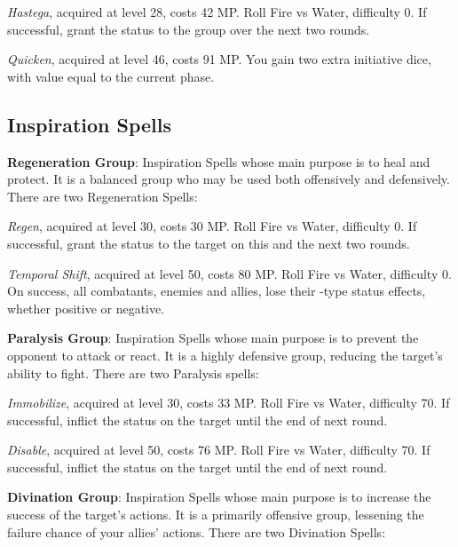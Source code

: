 \begin{multicols}{2}
    \textit{Hastega}, acquired at level 28, costs 42 MP\@. Roll Fire vs Water, difficulty 0. If successful, grant the  status to the group over the next two rounds.
    
    \textit{Quicken}, acquired at level 46, costs 91 MP\@. You gain two extra initiative dice, with value equal to the current phase.
    
    \subsection{Inspiration Spells}\label{subsec:time-inspiration}

    \textbf{Regeneration Group}: Inspiration Spells whose main purpose is to heal and protect. It is a balanced group who may be used both offensively and defensively. There are two Regeneration Spells:
    
    \textit{Regen}, acquired at level 30, costs 30 MP\@. Roll Fire vs Water, difficulty 0. If successful, grant the  status to the target on this and the next two rounds.
    
    \textit{Temporal Shift}, acquired at level 50, costs 80 MP\@. Roll Fire vs Water, difficulty 0. On success, all combatants, enemies and allies, lose their -type status effects, whether positive or negative.
 
    \ffcrystal[type=level,height=8pt]
   
    \textbf{Paralysis Group}: Inspiration Spells whose main purpose is to prevent the opponent to attack or react. It is a highly defensive group, reducing the target’s ability to fight. There are two Paralysis spells:
    
    \textit{Immobilize}, acquired at level 30, costs 33 MP\@. Roll Fire vs Water, difficulty 70. If successful, inflict the  status on the target until the end of next round.
    
    \textit{Disable}, acquired at level 50, costs 76 MP\@. Roll Fire vs Water, difficulty 70. If successful, inflict the  status on the target until the end of next round.
    
    \ffcrystal[type=level,height=8pt]

    \textbf{Divination Group}: Inspiration Spells whose main purpose is to increase the success of the target’s actions. It is a primarily offensive group, lessening the failure chance of your allies’ actions. There are two Divination Spells:
    

\end{multicols}
